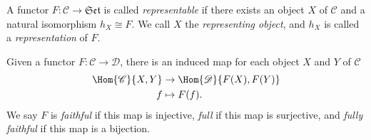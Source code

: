 \documentclass[10pt]{amsart}
\begin{document}
%  

\begin{defn}
  A functor $F \colon \mathscr{C} \rightarrow \mathfrak{Set}$ is called {\em representable} if there exists an object $X$ of $\mathscr{C}$ and a natural isomorphism $h_X \cong F$.
  We call $X$ the {\em representing object}, and $h_X$ is called a {\em representation} of $F$.
\end{defn}

\begin{defn}
  Given a functor $F : \mathscr{C} \rightarrow \mathscr{D}$, there is an induced map for each object $X$ and $Y$ of $\mathscr{C}$
  \begin{align*}
    \Hom{\mathscr{C}}{X,Y} &\rightarrow \Hom{\mathscr{D}}{F(X), F(Y)}\\
    f &\mapsto F(f).
  \end{align*}
  We say $F$ is {\em faithful} if this map is injective, {\em full} if this map is surjective, and {\em fully faithful} if this map is a bijection.
\end{defn}
\end{document}

